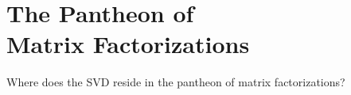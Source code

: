 \chapter[Pantheon of Matrix Factorizations]{The Pantheon of \\Matrix Factorizations}

Where does the SVD reside in the pantheon of matrix factorizations?




%
%
%
%



\endinput